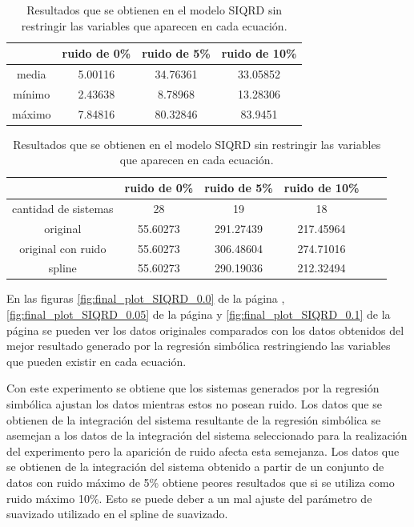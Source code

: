 \begin{table}[!h]
    \centering
    \caption{Resultados que se obtienen en el modelo SIQRD sin restringir las variables que aparecen en cada ecuación.}
    \begin{tabular}{|c|c|c|c|}
        \hline
               & \textbf{ruido de 0\%} & \textbf{ruido de 5\%} & \textbf{ruido de 10\%} \\
        \hline
        media  & 5.00116               & 34.76361              & 33.05852               \\
        \hline
        mínimo & 2.43638               & 8.78968               & 13.28306               \\
        \hline
        máximo & 7.84816               & 80.32846              & 83.9451                \\
        \hline
    \end{tabular}

    \begin{tabular}{|c|c|c|c|c|c|}
        \hline
                             & \textbf{ruido de 0\%} & \textbf{ruido de 5\%} & \textbf{ruido de 10\%} \\
        \hline
        cantidad de sistemas & 28                    & 19                    & 18                     \\
        \hline
        original             & 55.60273              & 291.27439             & 217.45964              \\
        \hline
        original con ruido   & 55.60273              & 306.48604             & 274.71016              \\
        \hline
        spline               & 55.60273              & 290.19036             & 212.32494              \\
        \hline
    \end{tabular}
    \label{table:experiment_SIQRD_all}
\end{table}

En las figuras \ref{fig:final_plot_SIQRD_0.0} de la página \pageref{fig:final_plot_SIQRD_0.0}, \ref{fig:final_plot_SIQRD_0.05} de la página \pageref{fig:final_plot_SIQRD_0.05} y \ref{fig:final_plot_SIQRD_0.1} de la página \pageref{fig:final_plot_SIQRD_0.1} se pueden ver los datos originales comparados con los datos obtenidos del mejor resultado generado por la regresión simbólica restringiendo las variables que pueden existir en cada ecuación.

Con este experimento se obtiene que los sistemas generados por la regresión simbólica ajustan los datos mientras estos no posean ruido. Los datos que se obtienen de la integración del sistema resultante de la regresión simbólica se asemejan a los datos de la integración del sistema seleccionado para la realización del experimento pero la aparición de ruido afecta esta semejanza. Los datos que se obtienen de la integración del sistema obtenido a partir de un conjunto de datos con ruido máximo de 5\% obtiene peores resultados que si se utiliza como ruido máximo 10\%. Esto se puede deber a un mal ajuste del parámetro de suavizado utilizado en el spline de suavizado.

